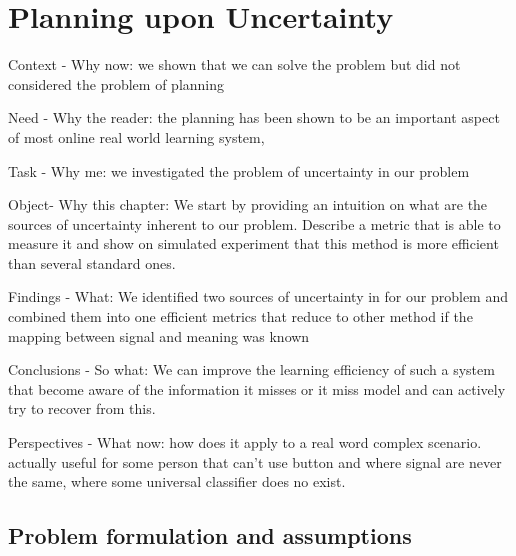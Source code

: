 \renewcommand{\chapterpath}{\allchapterspath/planning}
\renewcommand{\imgpath}{\chapterpath/img}

\chapter{Planning upon Uncertainty}
\label{chapter:planning}
\minitoc

Context - Why now: we shown that we can solve the problem but did not considered the problem of planning

Need - Why the reader: the planning has been shown to be an important aspect of most online real world learning system, 

Task - Why me: we investigated the problem of uncertainty in our problem

Object- Why this chapter: We start by providing an intuition on what are the sources of uncertainty inherent to our problem. Describe a metric that is able to measure it and show on simulated experiment that this method is more efficient than several standard ones.

Findings - What: We identified two sources of uncertainty in for our problem and combined them into one efficient metrics that reduce to other method if the mapping between signal and meaning was known

Conclusions - So what: We can improve the learning efficiency of such a system that become aware of the information it misses or it miss model and can actively try to recover from this.

Perspectives - What now: how does it apply to a real word complex scenario. actually useful for some person that can't use button and where signal are never the same, where some universal classifier does no exist.

\section{Problem formulation and assumptions}


